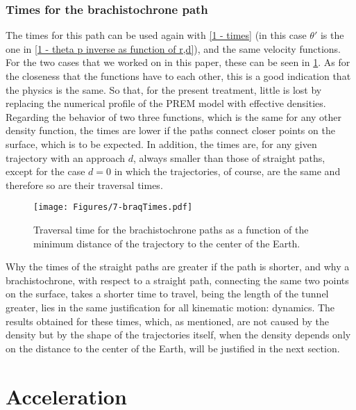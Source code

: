 \documentclass[aps,twocolumn,showpacs,preprintnumbers]{revtex4}
\begin{document}
        \subsubsection{Times for the brachistochrone path}
        
        The times for this path can be used again with \eqref{1 - times} (in this case $ \theta'$ is the one in \eqref{1 - theta p inverse as function of r,d}), and the same velocity functions. For the two cases that we worked on in this paper, these can be seen in \ref{fig:1-braquistochrone times}. As for the closeness that the functions have to each other, this is a good indication that the physics is the same. So that, for the present treatment, little is lost by replacing the numerical profile of the PREM model with effective densities. Regarding the behavior of two three functions, which is the same for any other density function, the times are lower if the paths connect closer points on the surface, which is to be expected. In addition, the times are, for any given trajectory with an approach $ d $, always smaller than those of straight paths, except for the case $ d = 0 $ in which the trajectories, of course, are the same and therefore so are their traversal times.
        
        \begin{figure}
            \centering
            \texttt{[image: Figures/7-braqTimes.pdf]}
            \caption{Traversal time for the brachistochrone paths as a function of the minimum distance of the trajectory to the center of the Earth.}
            \label{fig:1-braquistochrone times}
        \end{figure}
        
        Why the times of the straight paths are greater if the path is shorter, and why a brachistochrone, with respect to a straight path, connecting the same two points on the surface, takes a shorter time to travel, being the length of the tunnel greater, lies in the same justification for all kinematic motion: dynamics. The results obtained for these times, which, as mentioned, are not caused by the density but by the shape of the trajectories itself, when the density depends only on the distance to the center of the Earth, will be justified in the next section.
    
    
        
\section{Acceleration}  \label{acceleration section}
    
\end{document}
